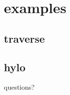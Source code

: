 \documentclass[include/preamble.tex]{subfiles}
\begin{document}
\section{examples}
\subsection{traverse}


\subsection{hylo}







{
  \begin{frame}
    \begin{center}
      questions?
    \end{center}
  \end{frame}
}
\end{document}
